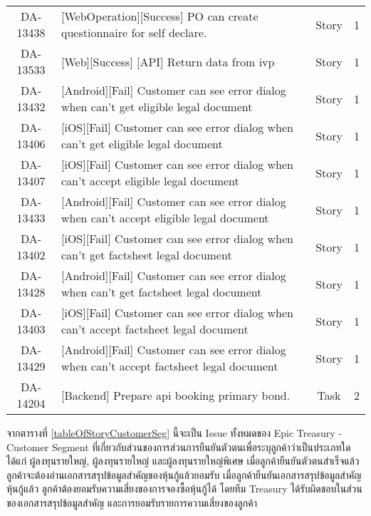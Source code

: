 \begin{tabularx}{\linewidth}{|c|X|c|c|}
    DA-13438 &[WebOperation][Success] PO can create questionnaire for self declare. &Story &1\\
    DA-13533 &[Web][Success] [API] Return data from ivp &Story &1\\
    DA-13432 &[Android][Fail] Customer can see error dialog when can't get eligible legal document &Story &1\\
    DA-13406 &[iOS][Fail] Customer can see error dialog when can't get eligible legal document &Story &1\\
    DA-13407 &[iOS][Fail] Customer can see error dialog when can't accept eligible legal document &Story &1\\
    DA-13433 &[Android][Fail] Customer can see error dialog when can't accept eligible legal document &Story &1\\
    DA-13402 &[iOS][Fail] Customer can see error dialog when can't get factsheet legal document &Story &1\\
    DA-13428 &[Android][Fail] Customer can see error dialog when can't get factsheet legal document &Story &1\\
    DA-13403 &[iOS][Fail] Customer can see error dialog when can't accept factsheet legal document &Story &1\\
    DA-13429 &[Android][Fail] Customer can see error dialog when can't accept factsheet legal document &Story &1\\
    DA-14204 &[Backend] Prepare api booking primary bond. &Task &2\\
	\hline
\end{tabularx}

จากตารางที่ \ref{tableOfStoryCustomerSeg}  นี้จะเป็น Issue ทั้งหมดของ Epic Treasury - Customer Segment ที่เกี่ยวกับส่วนของการส่วนการยืนยันตัวตนเพื่อระบุลูกค้าว่าเป็นประเภทใด ได้แก่ ผู้ลงทุนรายใหญ่, ผู้ลงทุนรายใหญ่ และผู้ลงทุนรายใหญ่พิเศษ
เมื่อลูกค้ายืนยันตัวตนสำเร็จแล้วลูกค้าจะต้องอ่านเอกสารสรุปข้อมูลสำคัญของหุ้นกู้แล้วยอมรับ เมื่อลูกค้ายืนยันเอกสารสรุปข้อมูลสำคัญหุ้นกู้แล้ว ลูกค้าต้องยอมรับความเสี่ยงของการจองซื้อหุ้นกู้ได้
โดยทีม Treasury ได้รับผิดชอบในส่วนของเอกสารสรุปข้อมูลสำคัญ และการยอมรับรายการความเสี่ยงของลูกค้า


